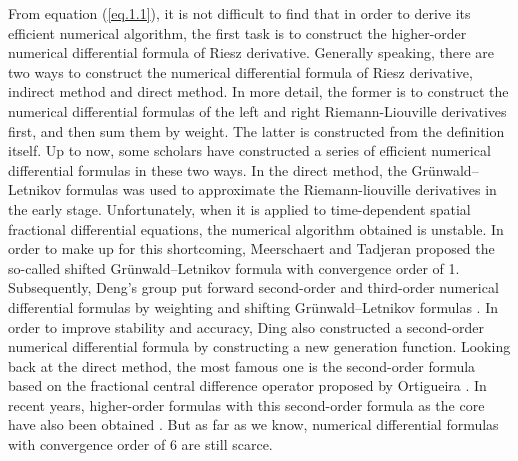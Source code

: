 \documentclass{siamart171218}
\numberwithin{theorem}{section}
\numberwithin{equation}{section}
\begin{document}
From equation (\ref{eq.1.1}), it is not difficult to find that
in order to derive its efficient numerical algorithm,
the first task is to construct the higher-order
numerical differential formula of Riesz derivative.
Generally speaking, there are two ways to construct
the numerical differential formula of Riesz derivative,
indirect method and direct method. In more detail,
the former is to construct the numerical differential
 formulas of the left and right Riemann-Liouville derivatives
 first, and then sum them by weight. The latter is constructed
 from the definition itself.
Up to now, some scholars have constructed a series of
 efficient numerical differential formulas in these two ways.
In the direct method, the Gr\"{u}nwald–Letnikov formulas was used
to approximate the Riemann-liouville derivatives in the early stage.
Unfortunately, when it is applied to time-dependent spatial
fractional differential equations, the numerical algorithm
obtained is unstable. In order to make up for this
shortcoming, Meerschaert and Tadjeran \cite{Meerschaert2004} proposed the
so-called shifted Gr\"{u}nwald–Letnikov formula with
convergence order of 1.
Subsequently, Deng's group put forward second-order
 and third-order numerical differential formulas
 by weighting and shifting Gr\"{u}nwald–Letnikov formulas
 \cite{Tian2015,Zhou2013}.
In order to improve stability and accuracy, Ding \cite{Ding2017} also
constructed a second-order numerical differential formula by
 constructing a new generation function.
Looking back at the direct method, the most famous one is the
second-order formula \cite{Celik2012}based on the fractional central
difference operator proposed by Ortigueira \cite{Ortigueira2006}.
In recent years, higher-order formulas with this second-order
formula as the core have also been obtained
\cite{Ding2015,Zhao2014,Ding20172}.
But as far as we know, numerical differential formulas
with convergence order of 6 are still scarce.
\end{document}
